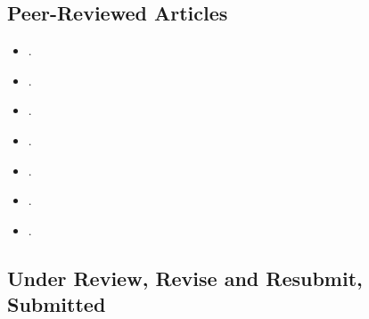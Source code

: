 \subsection*{Peer-Reviewed Articles}


\begin{itemize}

	\item[\textcolor{gray}{\textbullet}] \href{https://doi.org/10.1111/pops.12940}{{\bf {}}}.

	\item[\textcolor{gray}{\textbullet}] \href{https://doi.org/10.1016/j.electstud.2022.102497}{{\bf {}}}.

	\item[\textcolor{gray}{\textbullet}] \href{https://link.springer.com/article/10.1057/s41269-020-00174-4}{{\bf {}}}.

	\item[\textcolor{gray}{\textbullet}] \href{https://doi.org/10.1016/j.ejpoleco.2021.102048}{{\bf {}}}.

	\item[\textcolor{gray}{\textbullet}] \href{https://doi.org/10.1111/rsp3.12337}{{\bf {}}}.

	\item[\textcolor{gray}{\textbullet}] \href{https://doi.org/10.1177/1866802X1801000202}{{\bf {}}}.

	\item[\textcolor{gray}{\textbullet}] \href{https://scielo.conicyt.cl/pdf/revcipol/v31n2/art07.pdf}{}.
  
\end{itemize}

\subsection*{Under Review, Revise and Resubmit, Submitted}

